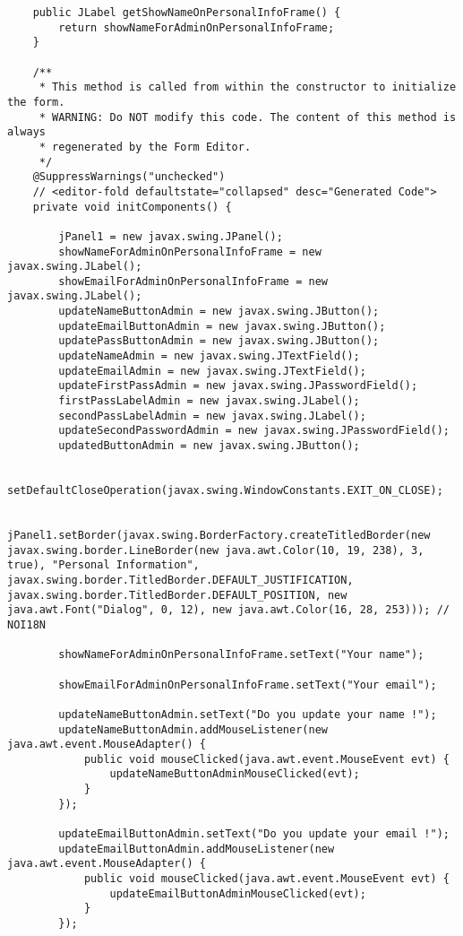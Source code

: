 \documentclass[12pt,a4paper]{article}
\begin{document}
\begin{lstlisting}
    public JLabel getShowNameOnPersonalInfoFrame() {
        return showNameForAdminOnPersonalInfoFrame;
    }

    /**
     * This method is called from within the constructor to initialize the form.
     * WARNING: Do NOT modify this code. The content of this method is always
     * regenerated by the Form Editor.
     */
    @SuppressWarnings("unchecked")
    // <editor-fold defaultstate="collapsed" desc="Generated Code">                          
    private void initComponents() {

        jPanel1 = new javax.swing.JPanel();
        showNameForAdminOnPersonalInfoFrame = new javax.swing.JLabel();
        showEmailForAdminOnPersonalInfoFrame = new javax.swing.JLabel();
        updateNameButtonAdmin = new javax.swing.JButton();
        updateEmailButtonAdmin = new javax.swing.JButton();
        updatePassButtonAdmin = new javax.swing.JButton();
        updateNameAdmin = new javax.swing.JTextField();
        updateEmailAdmin = new javax.swing.JTextField();
        updateFirstPassAdmin = new javax.swing.JPasswordField();
        firstPassLabelAdmin = new javax.swing.JLabel();
        secondPassLabelAdmin = new javax.swing.JLabel();
        updateSecondPasswordAdmin = new javax.swing.JPasswordField();
        updatedButtonAdmin = new javax.swing.JButton();

        setDefaultCloseOperation(javax.swing.WindowConstants.EXIT_ON_CLOSE);

        jPanel1.setBorder(javax.swing.BorderFactory.createTitledBorder(new javax.swing.border.LineBorder(new java.awt.Color(10, 19, 238), 3, true), "Personal Information", javax.swing.border.TitledBorder.DEFAULT_JUSTIFICATION, javax.swing.border.TitledBorder.DEFAULT_POSITION, new java.awt.Font("Dialog", 0, 12), new java.awt.Color(16, 28, 253))); // NOI18N

        showNameForAdminOnPersonalInfoFrame.setText("Your name");

        showEmailForAdminOnPersonalInfoFrame.setText("Your email");

        updateNameButtonAdmin.setText("Do you update your name !");
        updateNameButtonAdmin.addMouseListener(new java.awt.event.MouseAdapter() {
            public void mouseClicked(java.awt.event.MouseEvent evt) {
                updateNameButtonAdminMouseClicked(evt);
            }
        });

        updateEmailButtonAdmin.setText("Do you update your email !");
        updateEmailButtonAdmin.addMouseListener(new java.awt.event.MouseAdapter() {
            public void mouseClicked(java.awt.event.MouseEvent evt) {
                updateEmailButtonAdminMouseClicked(evt);
            }
        });


\end{lstlisting}
\end{document}
